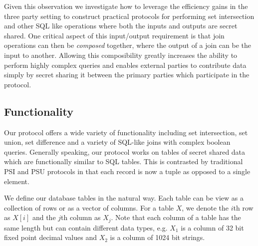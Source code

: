 Given this observation we investigate how to leverage the efficiency gains in the three party setting to construct practical protocols for performing set intersection and other SQL like operations where both the inputs and outputs are secret shared. One critical aspect of this input/output requirement is that join operations can then be \emph{composed} together, where the output of a join can be the input to another. Allowing this composibility greatly increases the ability to perform highly complex queries and enables external parties to contribute data simply by secret sharing it between the primary parties which participate in the protocol.

\subsection{Functionality}

Our protocol offers a wide variety of functionality including set intersection, set union, set difference and a variety of SQL-like joins with complex boolean queries. Generally speaking, our protocol works on tables of secret shared data which are functionally similar to SQL tables. This is contrasted by traditional PSI and PSU protocols\cite{usenix:PSZ14,USENIX:PSSZ15,PSZ16,CCS:KKRT16} in that each record is now a tuple as opposed to a single element. 

We define our database tables in the natural way. Each table can be view as a collection of rows or as a vector of columns. For a table $X$, we denote the $i$th row as $X[i]$ and the $j$th column as $X_j$. 
\iffullversion
Note that each column of a table has the same length but can contain different data types, e.g. $X_1$ is a column of 32 bit fixed point decimal values and $X_2$ is a column of 1024 bit strings.

